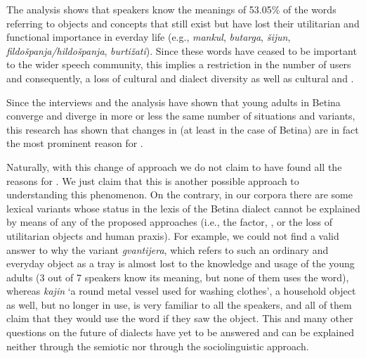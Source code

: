 \documentclass[output=paper]{LSP/langsci}
\begin{document}
The analysis shows that speakers know the meanings of 53.05\% of the words referring to objects and concepts that still exist but have lost their utilitarian and functional importance in everday life (e.g., \textit{mankul}, \textit{butarga}, \textit{šijun}, \textit{fildošpanja/hildošpanja}, \textit{burtižati}). Since these words have ceased to be important to the wider speech community, this implies a restriction in the number of users and consequently, a loss of cultural and dialect diversity as well as cultural and .

Since the interviews and the analysis have shown that young adults in Betina converge and diverge in more or less the same number of situations and variants, this research has shown that changes in  (at least in the case of Betina) are in fact the most prominent reason for . 

Naturally, with this change of approach we do not claim to have found all the reasons for . We just claim that this is another possible approach to understanding this phenomenon. On the contrary, in our corpora there are some lexical variants whose status in the lexis of the Betina dialect cannot be explained by means of any of the proposed approaches (i.e., the  factor, , or the loss of utilitarian objects and human praxis). For example, we could not find a valid answer to why the variant \textit{gvantijera}, which refers to such an ordinary and everyday object as a tray is almost lost to the knowledge and usage of the young adults (3 out of 7 speakers know its meaning, but none of them uses the word), whereas \textit{kajin} ‘a round metal vessel used for washing clothes’, a household object as well, but no longer in use, is very familiar to all the speakers, and all of them claim that they would use the word if they saw the object. This and many other questions on the future of dialects have yet to be answered and can be explained neither through the semiotic nor through the sociolinguistic approach.

\printbibliography[heading=subbibliography,notkeyword=this]
\end{document}
